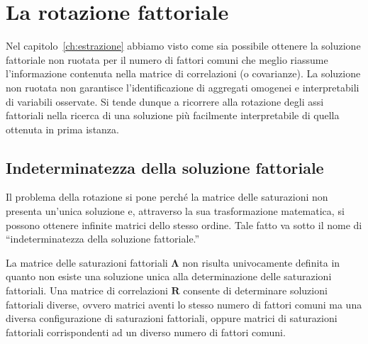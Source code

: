 
\chapter{La rotazione fattoriale}
\label{ch:rotazione}

Nel capitolo~\ref{ch:estrazione} abbiamo visto come sia possibile ottenere la soluzione fattoriale non ruotata per il numero di fattori comuni che meglio riassume l'informazione contenuta nella matrice di correlazioni (o covarianze). 
La soluzione non ruotata non garantisce l'identificazione di
aggregati omogenei e interpretabili di variabili osservate.
Si tende dunque a ricorrere alla rotazione degli assi fattoriali nella ricerca di una soluzione più facilmente interpretabile di quella ottenuta in prima istanza. 

\section{Indeterminatezza della soluzione fattoriale}

 Il problema della rotazione si pone perché la matrice delle saturazioni non presenta un'unica soluzione e, attraverso la sua trasformazione matematica, si possono ottenere infinite matrici dello stesso ordine. Tale fatto va sotto il nome di ``indeterminatezza della soluzione fattoriale.''

La matrice delle saturazioni fattoriali $\boldsymbol{\Lambda}$ non risulta univocamente definita in quanto non esiste una soluzione unica alla determinazione delle saturazioni fattoriali. Una matrice di correlazioni $\boldsymbol{R}$ consente di determinare soluzioni fattoriali diverse, ovvero matrici aventi lo stesso numero di fattori comuni ma una diversa configurazione di saturazioni fattoriali, oppure matrici di saturazioni fattoriali corrispondenti ad un diverso numero di fattori comuni.

\bigskip

